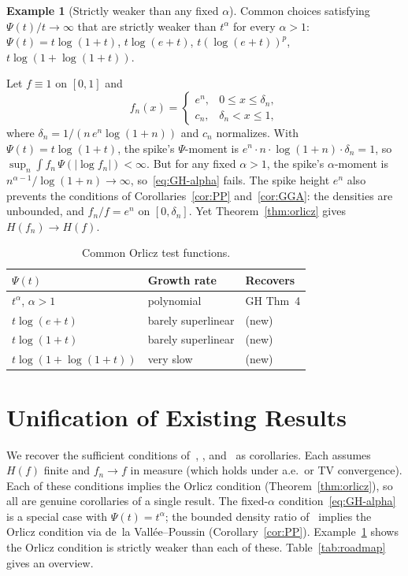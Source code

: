 \documentclass[journal]{IEEEtran}
\theoremstyle{definition}
\newtheorem{example}[theorem]{Example}
\theoremstyle{remark}
\newcommand{\1}{\mathbf{1}}
\newcommand{\Hent}{H}
\newcommand{\abs}[1]{\lvert #1 \rvert}
\begin{document}
\begin{example}[Strictly weaker than any fixed $\alpha$]
  \label{ex:orlicz-examples}
Common choices satisfying $\Psi(t)/t \to \infty$ that are strictly
weaker than $t^\alpha$ for every $\alpha > 1$:
$\Psi(t) = t \log(1{+}t)$,\; $t \log(e{+}t)$,\;
$t (\log(e{+}t))^p$,\; $t \log(1{+}\log(1{+}t))$.

Let $f \equiv 1$ on $[0,1]$ and
\[
  f_n(x) = \begin{cases}
    e^n, & 0 \leq x \leq \delta_n, \\
    c_n, & \delta_n < x \leq 1,
  \end{cases}
\]
where $\delta_n = 1/(n\, e^n \log(1{+}n))$ and $c_n$ normalizes.
With $\Psi(t) = t\log(1{+}t)$, the spike's $\Psi$-moment is
$e^n \cdot n \cdot \log(1{+}n) \cdot \delta_n = 1$,
so $\sup_n \int f_n\, \Psi(\abs{\log f_n}) < \infty$.
But for any fixed $\alpha > 1$, the spike's $\alpha$-moment is
$n^{\alpha-1}/\log(1{+}n) \to \infty$,
so~\eqref{eq:GH-alpha} fails.
The spike height $e^n$ also prevents the conditions of
Corollaries~\ref{cor:PP} and~\ref{cor:GGA}:
the densities are unbounded, and $f_n/f = e^n$ on $[0,\delta_n]$.
Yet Theorem~\ref{thm:orlicz} gives
$\Hent(f_n) \to \Hent(f)$.

\end{example}

\begin{table}[ht]
\centering
\caption{Common Orlicz test functions.}\label{tab:Psi}
\begin{tabular}{@{}lll@{}}
\toprule
$\Psi(t)$ & Growth rate & Recovers \\
\midrule
$t^\alpha$, $\alpha > 1$ & polynomial & GH Thm~4 \\
$t\log(e+t)$ & barely superlinear & (new) \\
$t\log(1+t)$ & barely superlinear & (new) \\
$t\log(1+\log(1+t))$ & very slow & (new) \\
\bottomrule
\end{tabular}
\end{table}

\section{Unification of Existing Results}\label{sec:corollaries}

We recover the sufficient conditions
of~\cite{GodavartiHero2004}, \cite{PieraParada2009},
and~\cite{GhourchianGohariAmini2017} as corollaries.
Each assumes $\Hent(f)$ finite and $f_n \to f$ in measure
(which holds under a.e.\ or TV convergence).
Each of these conditions implies the Orlicz condition
(Theorem~\ref{thm:orlicz}), so all are genuine corollaries of a
single result.  The fixed-$\alpha$ condition~\eqref{eq:GH-alpha}
is a special case with $\Psi(t) = t^\alpha$;
the bounded density ratio of~\cite{PieraParada2009} implies the
Orlicz condition via de~la Vall\'{e}e--Poussin
(Corollary~\ref{cor:PP}).
Example~\ref{ex:orlicz-examples} shows the Orlicz condition is
strictly weaker than each of these.
Table~\ref{tab:roadmap} gives an overview.
\end{document}
